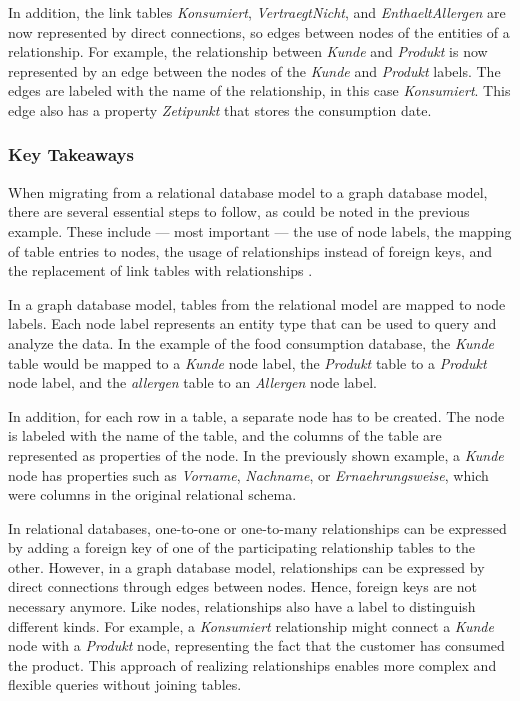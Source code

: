 In addition, the link tables \textit{Konsumiert}, \textit{VertraegtNicht}, and \textit{EnthaeltAllergen} are now represented by direct connections, so edges between nodes of the entities of a relationship. For example, the relationship between \textit{Kunde} and \textit{Produkt} is now represented by an edge between the nodes of the \textit{Kunde} and \textit{Produkt} labels. The edges are labeled with the name of the relationship, in this case \textit{Konsumiert}. This edge also has a property \textit{Zetipunkt} that stores the consumption date.

\subsubsection*{Key Takeaways}

When migrating from a relational database model to a graph database model, there are several essential steps to follow, as could be noted in the previous example. These include --- most important --- the use of node labels, the mapping of table entries to nodes, the usage of relationships instead of foreign keys, and the replacement of link tables with relationships \parencite{neo4j_docs_migration}.

In a graph database model, tables from the relational model are mapped to node labels. Each node label represents an entity type that can be used to query and analyze the data. In the example of the food consumption database, the \textit{Kunde} table would be mapped to a \textit{Kunde} node label, the \textit{Produkt} table to a \textit{Produkt} node label, and the \textit{allergen} table to an \textit{Allergen} node label.

In addition, for each row in a table, a separate node has to be created. The node is labeled with the name of the table, and the columns of the table are represented as properties of the node. In the previously shown example, a \textit{Kunde} node has properties such as \textit{Vorname}, \textit{Nachname}, or \textit{Ernaehrungsweise}, which were columns in the original relational schema.

In relational databases, one-to-one or one-to-many relationships can be expressed by adding a foreign key of one of the participating relationship tables to the other. However, in a graph database model, relationships can be expressed by direct connections through edges between nodes. Hence, foreign keys are not necessary anymore. Like nodes, relationships also have a label to distinguish different kinds. For example, a \textit{Konsumiert} relationship might connect a \textit{Kunde} node with a \textit{Produkt} node, representing the fact that the customer has consumed the product. This approach of realizing relationships enables more complex and flexible queries without joining tables.


